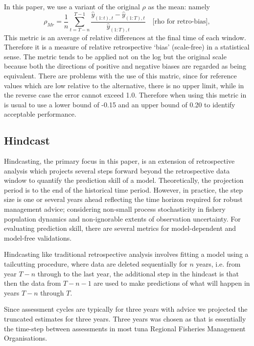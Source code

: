 \documentclass[12pt,halfline,a4paper,nonumbib]{ouparticle}
\newcommand{\disp}{\displaystyle}
\begin{document}
In this paper, we use a variant of the original $\rho$ as the mean: namely 
\begin{equation}
\label{eqn:mohn}
\rho_{Mr} = \disp \frac{1}{n} \sum_{t=T-n}^{T-1} \frac{\hat{y}_{(1:t),t}-\hat{y}_{(1:T),t}}{\hat{y}_{(1:T),t}} 
\quad \mbox{[rho for retro-bias]}, 
\end{equation}
This metric is an average of relative differences at the final time of each window. Therefore it is a measure of relative retrospective `bias' (scale-free) in a statistical sense. The metric tends to be applied not on the log but the original scale because both the directions of positive and negative biases are regarded as being equivalent.  There are problems with the use of this matric, since for reference values which are low relative to the alternative, there is no upper limit, while in the reverse case the error cannot exceed 1.0. Therefore when using this metric in is usual to use a lower bound of -0.15 and an upper bound of 0.20 to identify acceptable performance.

\subsection{Hindcast}

Hindcasting, the primary focus in this paper, is an extension of retrospective analysis which projects several steps forward beyond the retrospective data window to quantify the prediction skill of a model. Theoretically, the projection period is to the end of the historical time period. However, in practice, the step size is one or several years ahead reflecting the time horizon required for robust management advice; considering non-small process stochasticity in fishery population dynamics and non-ignorable extents of observation uncertainty. For evaluating prediction skill, there are several metrics for model-dependent and model-free validations. 

Hindcasting like traditional retrospective analysis involves fitting a model using a tailcutting procedure, where data are deleted sequentially for $n$ years, i.e. from year $T − n$ through to the last year, the additional step in the hindcast is that then the data from $T - n - 1$ are used to make predictions of what will happen in years $T - n$ through $T$.

Since assessment cycles are typically for three years  with advice \parencite{fricker2013three} we projected the truncated estimates for three years. Three years was chosen as that is essentially the time-step between assessments in most tuna Regional Fisheries Management Organisations.
\end{document}
